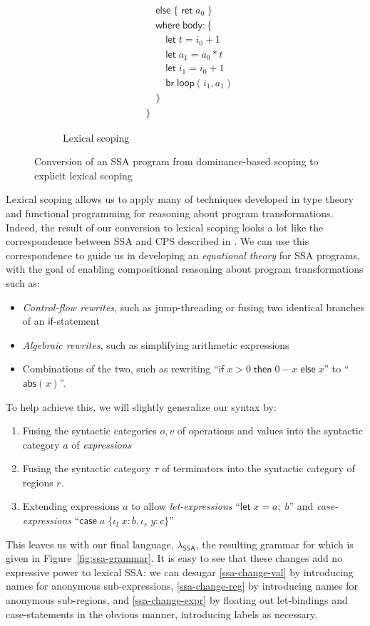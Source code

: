 \documentclass[acmsmall,screen,review]{acmart}
\newcommand{\ms}[1]{\ensuremath{\mathsf{#1}}}
\newcommand{\lto}{:}
\newcommand{\linl}[1]{\iota_l\;{#1}}
\newcommand{\linr}[1]{\iota_r\;{#1}}
\newcommand{\letexpr}[3]{\ensuremath{\ms{let}\;#1 = #2;\;#3}}
\newcommand{\caseexpr}[5]{\ms{case}\;#1\;\{\linl{#2} \lto #3, \linr{#4} \lto #5\}}
\newcommand{\isotopessa}{\(\lambda_{\ms{SSA}}\)}
\begin{document}
\begin{figure}
\begin{subfigure}[t]{.5\textwidth}
\begin{align*}
      & \quad \ms{else}\;\{\;\ms{ret}\;a_0\;\} \\
      & \quad \ms{where}\;\ms{body}: \{\\ 
      & \qquad \ms{let}\;t = i_0 + 1 \\
      & \qquad \ms{let}\;a_1 = a_0 * t \\
      & \qquad \ms{let}\;i_1 = i_0 + 1 \\
      & \qquad \ms{br}\;\ms{loop}(i_1, a_1) \\
      & \quad \} \\
      & \}
    \end{align*}
    \caption{Lexical scoping}
  \end{subfigure}
  \caption{Conversion of an SSA program from dominance-based scoping to explicit lexical scoping}
  \Description{}
  \label{fig:dominance-to-lexical}
\end{figure}

Lexical scoping allows us to apply many of techniques developed in type theory
and functional programming for reasoning about program transformations. 
Indeed, the result of our conversion to lexical scoping looks a lot like the correspondence
between SSA and CPS described in \citet{kelsey-95-cps}. We can use this correspondence to guide us
in developing an \textit{equational theory} for SSA programs, with the goal of enabling
compositional reasoning about program transformations such as:
\begin{itemize}
  \item \textit{Control-flow rewrites}, such as jump-threading or fusing two identical branches of
  an \ms{if}-statement
  \item \textit{Algebraic rewrites}, such as simplifying arithmetic expressions
  \item Combinations of the two, such as rewriting ``$\ms{if}\;x > 0\;\ms{then}\;0 - x\;\ms{else}\;
  x$'' to ``$\ms{abs}(x)$''.
\end{itemize}
To help achieve this, we will slightly generalize our syntax by:
\begin{enumerate}
  \item Fusing the syntactic categories $o, v$ of operations and values into the syntactic category
  $a$ of \emph{expressions} \label{ssa-change-val}
  \item Fusing the syntactic category $\tau$ of terminators into the syntactic category of regions
  $r$. \label{ssa-change-reg}
  \item Extending expressions $a$ to allow \emph{let-expressions} ``$\letexpr{x}{a}{b}$'' and
  \emph{case-expressions} ``$\caseexpr{a}{x}{b}{y}{c}$'' \label{ssa-change-expr}
\end{enumerate}
This leaves us with our final language, \isotopessa{}, the resulting grammar for which is given in
Figure~\ref{fig:ssa-grammar}. It is easy to see that these changes add no expressive power to
lexical SSA: we can desugar \ref{ssa-change-val} by introducing names for anonymous sub-expressions,
\ref{ssa-change-reg} by introducing names for anonymous sub-regions, and \ref{ssa-change-expr} by
floating out let-bindings and case-statements in the obvious manner, introducing labels as
necessary.
\end{document}
